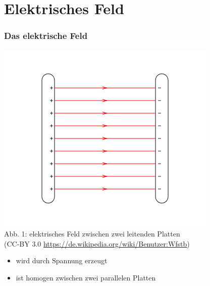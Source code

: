 

\subtitle{Technik Klasse E 08: \\
          Elektromagnetisches Feld \\[2em]}
\date{Stand 03.12.2015}



\section*{Elektrisches Feld}
\begin{frame}
\frametitle{Das elektrische Feld}
	\begin{center}
        \includegraphics[width=\textwidth,height=.6\textheight,keepaspectratio]{e08/PlattenkondensatorFeld.png}\\
        {\scriptsize Abb. 1: elektrisches Feld zwischen zwei leitenden Platten\\
         (CC-BY 3.0 \url{https://de.wikipedia.org/wiki/Benutzer:Wfstb})}
		\begin{itemize}
			\item wird durch Spannung erzeugt
			\item ist homogen zwischen zwei parallelen Platten
		\end{itemize}
	\end{center}
\end{frame}

